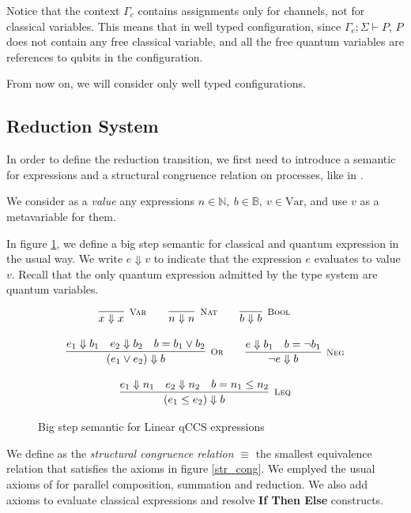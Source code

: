 Notice that the context $\Gamma_c$ contains assignments only for channels, not for classical variables. This means that in well typed configuration, since $\Gamma_c; \Sigma \vdash P$, $P$ does not contain any free classical variable, and all the free quantum variables are references to qubits in the configuration.

From now on, we will consider only well typed configurations.

\subsection{Reduction System}
In order to define the reduction transition, we first need to introduce a semantic for expressions and a structural congruence relation on processes, like in \cite{gayCommunicatingQuantumProcesses2005}.

We consider as a \textit{value} any expressions $n \in \mathbb{N},\  b \in \mathbb{B},\  v \in  \text{Var}$, and use $v$ as a metavariable for them.

In figure \ref{big_step_exp}, we define a big step semantic for classical and quantum expression in the usual way. We write $e \Downarrow v$ to indicate that the expression $e$ evaluates to value $v$. Recall that the only quantum expression admitted by the type system are quantum variables.

\begin{figure}[h!]
\caption{Big step semantic for Linear qCCS expressions}
\label{big_step_exp}
\begin{gather*}
\infer[\mbox{\footnotesize\scshape Var}]{x \Downarrow x}{} \qquad
    \infer[\mbox{\footnotesize\scshape Nat}]{n \Downarrow n}{} \qquad
    \infer[\mbox{\footnotesize\scshape Bool}]{b \Downarrow b}{}  \qquad
\\[0.3cm]
    \infer[\mbox{\footnotesize\scshape Or}]{(e_1 \lor e_2) \Downarrow b}{e_1 \Downarrow b_1 & e_2 \Downarrow b_2 & b = b_1 \lor b_2} \qquad
    \infer[\mbox{\footnotesize\scshape Neg}]{\neg e \Downarrow b}{e \Downarrow b_1 & b = \neg b_1} \\[0.3cm]
    \infer[\mbox{\footnotesize\scshape Leq}]{(e_1 \leq e_2) \Downarrow b}{e_1 \Downarrow n_1 & e_2 \Downarrow n_2 & b = n_1 \leq n_2}
\end{gather*}
\end{figure}

We define as the \textit{structural congruence relation} $\equiv$ the smallest equivalence relation that satisfies the axioms in figure \ref{str_cong}. We emplyed the usual axioms of \cite{milnerFunctionsProcesses1990} for parallel composition, summation and reduction. We also add axioms to evaluate classical expressions and resolve \textbf{If Then Else} constructs.

